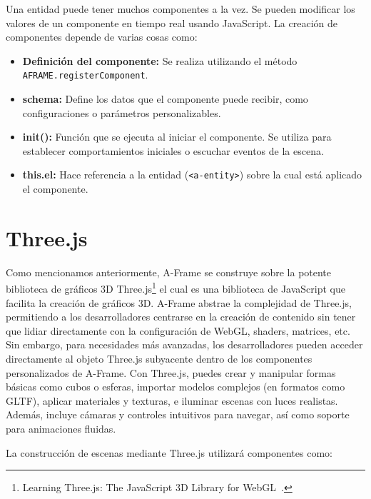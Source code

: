 \documentclass[a4paper, 12pt]{book}
\let\cleardoublepage\clearpage
\begin{document}
Una entidad puede tener muchos componentes a la vez. Se pueden modificar los valores de un componente en tiempo real usando JavaScript. La creación de componentes depende de varias cosas como:
\begin{itemize}
  \item \textbf{Definición del componente:} Se realiza utilizando el método \texttt{AFRAME.registerComponent}.
  
  \item \textbf{schema:} Define los datos que el componente puede recibir, como configuraciones o parámetros personalizables.
  
  \item \textbf{init():} Función que se ejecuta al iniciar el componente. Se utiliza para establecer comportamientos iniciales o escuchar eventos de la escena.
  
  \item \textbf{this.el:} Hace referencia a la entidad (\texttt{<a-entity>}) sobre la cual está aplicado el componente.
\end{itemize}

\cleardoublepage
\section{Three.js} 
\label{sec:seccion3}

Como mencionamos anteriormente, A-Frame se construye sobre la potente biblioteca de gráficos 3D Three.js\footnote{Learning Three.js: The 
JavaScript 3D Library for 
WebGL~\cite{dirksen2013learning}.} el cual es una biblioteca de JavaScript que facilita la creación de gráficos 3D. A-Frame abstrae la complejidad de Three.js, permitiendo a los desarrolladores centrarse en la creación de contenido sin tener que lidiar directamente con la configuración de WebGL, shaders, matrices, etc. Sin embargo, para necesidades más avanzadas, los desarrolladores pueden acceder directamente al objeto Three.js subyacente dentro de los componentes personalizados de A-Frame.
Con Three.js, puedes crear y manipular formas básicas como cubos o esferas, importar modelos complejos (en formatos como GLTF), aplicar materiales y texturas, e iluminar escenas con luces realistas. Además, incluye cámaras y controles intuitivos para navegar, así como soporte para animaciones fluidas. 

La construcción de escenas mediante Three.js utilizará componentes como:
\end{document}
